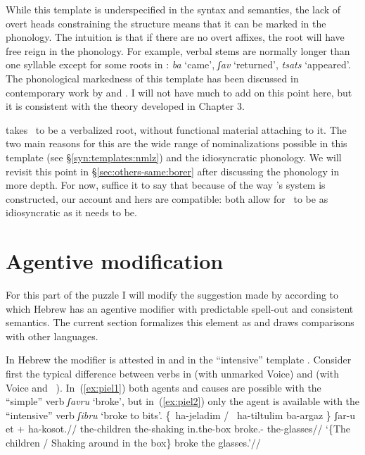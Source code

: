 While this template is underspecified in the syntax and semantics, the lack of overt heads constraining the structure means that it can be marked in the phonology. {The intuition is that if there are no overt affixes, the root will have free reign in the phonology.} For example, verbal stems are normally longer than one syllable except for some roots in \tkal:
\ex \emph{ba} `came', \emph{ʃav} `returned', \emph{tsats} `appeared'.
\xe
The phonological markedness of this template has been discussed in contemporary work by \cite{ussishkin00phd,ussishkin05} and \cite{laks11}. I will not have much to add on this point here, but it is consistent with the theory developed in Chapter 3.

\cite{borer13oup,borer15roots} takes \tkal~to be a verbalized root, without functional material attaching to it. The two main reasons for this are the wide range of nominalizations possible in this template (see \S\ref{syn:templates:nmlz}) and the idiosyncratic phonology. We will revisit this point in {\S\ref{sec:others-same:borer}} after discussing the phonology in more depth. For now, suffice it to say that because of the way \citeauthor{borer13oup}'s system is constructed, our account and hers are compatible: both allow for \tkal~to be as idiosyncratic as it needs to be.


\section{Agentive modification}

For this part of the puzzle I will modify the suggestion made by \cite{doron03} according to which Hebrew has an agentive modifier with predictable spell-out and consistent semantics. The current section formalizes this element as {\va} and draws comparisons with other languages.

In Hebrew the modifier {\va} is attested in {\thit} and in the ``intensive'' template {\tpie}. Consider first the typical difference between verbs in {\tkal} (with unmarked Voice) and {\tpie} (with Voice and \va~\!). In~(\ref{ex:piel1}) both agents and causes are possible with the ``simple'' {\tkal} verb \emph{ʃavru} `broke', but in~(\ref{ex:piel2}) only the agent is available with the ``intensive'' {\tpie} verb \emph{ʃibru} `broke to bits'.
\pex \citet[20]{doron03}
	\a \label{ex:piel1}\begingl
	\gla \{\cmark~ha-jeladim / \cmark~ha-tiltulim ba-argaz \} ʃar-u et + \phantom{\{\cmark~}ha-kosot.//
	\glb \phantom{\{\cmark~}the-children {} \phantom{\cmark~}the-shaking in.the-box {} broke.-  \phantom{\{\cmark~}the-glasses//
	\glft `\{The children / Shaking around in the box\} broke the glasses.'//
	\endgl

